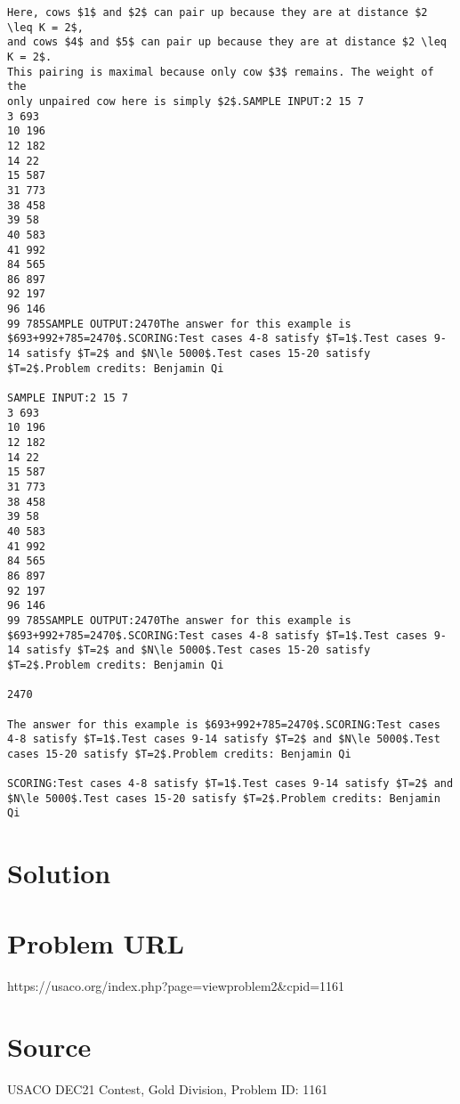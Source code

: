 \documentclass[12pt]{article}
\begin{document}
\begin{verbatim}
Here, cows $1$ and $2$ can pair up because they are at distance $2 \leq K = 2$,
and cows $4$ and $5$ can pair up because they are at distance $2 \leq K = 2$.
This pairing is maximal because only cow $3$ remains. The weight of the
only unpaired cow here is simply $2$.SAMPLE INPUT:2 15 7
3 693
10 196
12 182
14 22
15 587
31 773
38 458
39 58
40 583
41 992
84 565
86 897
92 197
96 146
99 785SAMPLE OUTPUT:2470The answer for this example is $693+992+785=2470$.SCORING:Test cases 4-8 satisfy $T=1$.Test cases 9-14 satisfy $T=2$ and $N\le 5000$.Test cases 15-20 satisfy $T=2$.Problem credits: Benjamin Qi

SAMPLE INPUT:2 15 7
3 693
10 196
12 182
14 22
15 587
31 773
38 458
39 58
40 583
41 992
84 565
86 897
92 197
96 146
99 785SAMPLE OUTPUT:2470The answer for this example is $693+992+785=2470$.SCORING:Test cases 4-8 satisfy $T=1$.Test cases 9-14 satisfy $T=2$ and $N\le 5000$.Test cases 15-20 satisfy $T=2$.Problem credits: Benjamin Qi

2470

The answer for this example is $693+992+785=2470$.SCORING:Test cases 4-8 satisfy $T=1$.Test cases 9-14 satisfy $T=2$ and $N\le 5000$.Test cases 15-20 satisfy $T=2$.Problem credits: Benjamin Qi

SCORING:Test cases 4-8 satisfy $T=1$.Test cases 9-14 satisfy $T=2$ and $N\le 5000$.Test cases 15-20 satisfy $T=2$.Problem credits: Benjamin Qi
\end{verbatim}

\section*{Solution}


\section*{Problem URL}
https://usaco.org/index.php?page=viewproblem2&cpid=1161

\section*{Source}
USACO DEC21 Contest, Gold Division, Problem ID: 1161
\end{document}
